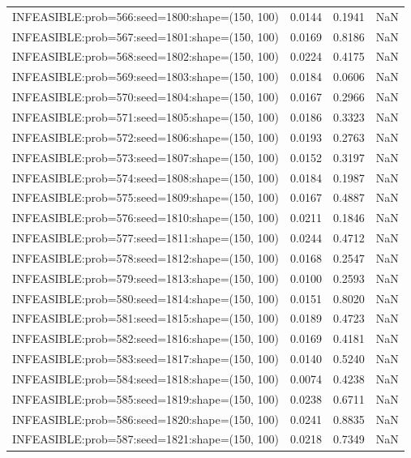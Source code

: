 \begin{longtable}{lccc}
INFEASIBLE:prob=566:seed=1800:shape=(150, 100) &   0.0144 &  0.1941 &    NaN \\
INFEASIBLE:prob=567:seed=1801:shape=(150, 100) &   0.0169 &  0.8186 &    NaN \\
INFEASIBLE:prob=568:seed=1802:shape=(150, 100) &   0.0224 &  0.4175 &    NaN \\
INFEASIBLE:prob=569:seed=1803:shape=(150, 100) &   0.0184 &  0.0606 &    NaN \\
INFEASIBLE:prob=570:seed=1804:shape=(150, 100) &   0.0167 &  0.2966 &    NaN \\
INFEASIBLE:prob=571:seed=1805:shape=(150, 100) &   0.0186 &  0.3323 &    NaN \\
INFEASIBLE:prob=572:seed=1806:shape=(150, 100) &   0.0193 &  0.2763 &    NaN \\
INFEASIBLE:prob=573:seed=1807:shape=(150, 100) &   0.0152 &  0.3197 &    NaN \\
INFEASIBLE:prob=574:seed=1808:shape=(150, 100) &   0.0184 &  0.1987 &    NaN \\
INFEASIBLE:prob=575:seed=1809:shape=(150, 100) &   0.0167 &  0.4887 &    NaN \\
INFEASIBLE:prob=576:seed=1810:shape=(150, 100) &   0.0211 &  0.1846 &    NaN \\
INFEASIBLE:prob=577:seed=1811:shape=(150, 100) &   0.0244 &  0.4712 &    NaN \\
INFEASIBLE:prob=578:seed=1812:shape=(150, 100) &   0.0168 &  0.2547 &    NaN \\
INFEASIBLE:prob=579:seed=1813:shape=(150, 100) &   0.0100 &  0.2593 &    NaN \\
INFEASIBLE:prob=580:seed=1814:shape=(150, 100) &   0.0151 &  0.8020 &    NaN \\
INFEASIBLE:prob=581:seed=1815:shape=(150, 100) &   0.0189 &  0.4723 &    NaN \\
INFEASIBLE:prob=582:seed=1816:shape=(150, 100) &   0.0169 &  0.4181 &    NaN \\
INFEASIBLE:prob=583:seed=1817:shape=(150, 100) &   0.0140 &  0.5240 &    NaN \\
INFEASIBLE:prob=584:seed=1818:shape=(150, 100) &   0.0074 &  0.4238 &    NaN \\
INFEASIBLE:prob=585:seed=1819:shape=(150, 100) &   0.0238 &  0.6711 &    NaN \\
INFEASIBLE:prob=586:seed=1820:shape=(150, 100) &   0.0241 &  0.8835 &    NaN \\
INFEASIBLE:prob=587:seed=1821:shape=(150, 100) &   0.0218 &  0.7349 &    NaN \\

\end{longtable}
